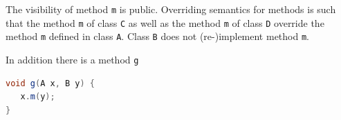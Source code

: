 \documentclass{article}
\begin{document}
\begin{enumerate}

The visibility of method \lstinline!m! is public. Overriding semantics
for methods is such that the method \lstinline!m!  of class
\lstinline!C! as well as the method \lstinline!m! of class
\lstinline!D! override the method \lstinline!m! defined in class
\lstinline!A!. Class \lstinline!B! does not (re-)implement method
\lstinline!m!.

In addition there is a method \lstinline!g! 
\begin{lstlisting}[language=Java, columns=flexible]
void g(A x, B y) {
   x.m(y);
}
\end{lstlisting}


\end{enumerate}
\end{document}
